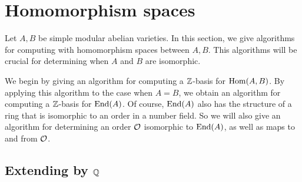 
\section{Homomorphism spaces}

Let $A, B$ be simple modular abelian varieties. In this section, we give
algorithms for computing with homomorphism spaces between $A, B$. This
algorithms will be crucial for determining when $A$ and $B$ are isomorphic. 

We begin by giving an algorithm for computing a $\mathbb{Z}$-basis for $\operatorname{Hom}(A,B)$.
By applying this algorithm to the case when $A=B$, we obtain an algorithm for
computing a $\mathbb{Z}$-basis for $\operatorname{End}(A)$. Of course, $\operatorname{End}(A)$ also has the
structure of a ring that is isomorphic to an order in a number field. So we
will also give an algorithm for determining an order $\mathcal{O}$ isomorphic to
$\operatorname{End}(A)$, as well as maps to and from $\mathcal{O}$.

\subsection{Extending by $\mathbb{Q}$}%
\label{sub:extending_by_qq_}

